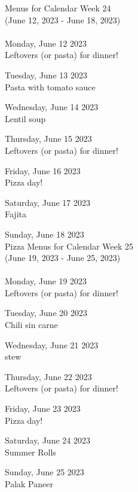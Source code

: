 \documentclass[12pt, parskip=full*]{scrreprt}
\begin{document}
\begin{center}{\Large Menus for Calendar Week 24} \\ 
{\small (June 12, 2023 - June 18, 2023)}\\ 
 ~ \\{\calligra \Large Monday, June 12 2023} \\ 
Leftovers (or pasta) for dinner!

{\calligra \Large Tuesday, June 13 2023} \\ 
Pasta with tomato sauce

{\calligra \Large Wednesday, June 14 2023} \\ 
Lentil soup

{\calligra \Large Thursday, June 15 2023} \\ 
Leftovers (or pasta) for dinner!

{\calligra \Large Friday, June 16 2023} \\ 
Pizza day!

{\calligra \Large Saturday, June 17 2023} \\ 
Fajita

{\calligra \Large Sunday, June 18 2023} \\ 
Pizza
\newpage
{\Large Menus for Calendar Week 25} \\ 
{\small (June 19, 2023 - June 25, 2023)}\\ 
 ~ \\{\calligra \Large Monday, June 19 2023} \\ 
Leftovers (or pasta) for dinner!

{\calligra \Large Tuesday, June 20 2023} \\ 
Chili sin carne

{\calligra \Large Wednesday, June 21 2023} \\ 
stew

{\calligra \Large Thursday, June 22 2023} \\ 
Leftovers (or pasta) for dinner!

{\calligra \Large Friday, June 23 2023} \\ 
Pizza day!

{\calligra \Large Saturday, June 24 2023} \\ 
Summer Rolls

{\calligra \Large Sunday, June 25 2023} \\ 
Palak Paneer
\end{center}
\end{document}
